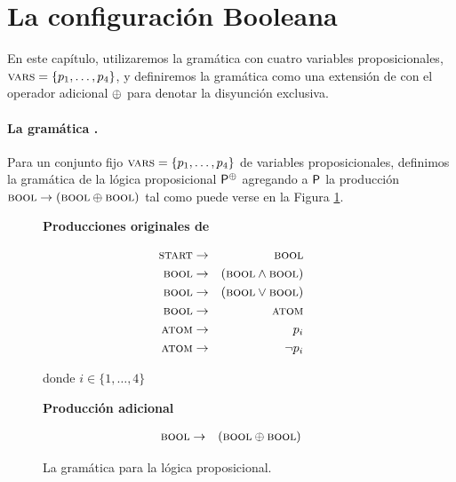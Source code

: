 \section{La configuración Booleana}

En este capítulo, utilizaremos la gramática \grambool con cuatro variables proposicionales, $\textsc{vars}=\{p_1,\dots,p_4\}$, y definiremos la gramática \gramboolxor como una extensión de \grambool con el operador adicional $\oplus$ para denotar la disyunción exclusiva.

\paragraph{La gramática \gramboolxor.}
Para un conjunto fijo $\textsc{vars}=\{p_1,\dots,p_4\}$ de variables proposicionales, definimos la gramática de la lógica proposicional ${\sf P}^\oplus$ agregando a ${\sf P}$ la producción $\textsc{bool} \to (\textsc{bool} \oplus \textsc{bool})$ tal como puede verse en la Figura \ref{PCFG}.
%
\begin{figure}[h!]
\begin{center}
\textbf{Producciones originales de \grambool}
\end{center}
\vspace{-.5cm}
\begin{eqnarray*}
\textsc{start} &\to&\textsc{bool}\\
\textsc{bool} &\to&(\textsc{bool} \wedge \textsc{bool}) \\
\textsc{bool} &\to&(\textsc{bool} \vee \textsc{bool}) \\
\textsc{bool} &\to&\textsc{atom}\\
\textsc{atom} &\to& p_i \\
\textsc{atom} &\to&\lnot p_i
\end{eqnarray*}
\begin{center}
donde $i\in\{1,\dots,4\}$\\

\medskip

\textbf{Producción adicional}
\end{center}
\vspace{-.5cm}
\begin{eqnarray*}
\textsc{bool} &\to&(\textsc{bool} \oplus \textsc{bool})
\end{eqnarray*}

\caption{La gramática \gramboolxor para la lógica proposicional.}
\label{PCFG}
\end{figure}

